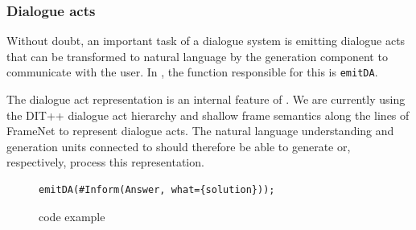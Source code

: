 \subsubsection{Dialogue acts}
\label{sec:caret}


Without doubt, an important task of a dialogue system is emitting dialogue acts that can be transformed to natural language by the generation component to communicate with the user. In \vonda, the function responsible for this is \texttt{emitDA}.

The dialogue act representation is an internal feature of \vonda. We are currently using the DIT++ dialogue act hierarchy \citep{bunt2012iso} and shallow frame semantics along the lines of FrameNet \citep{ruppenhofer2016framenet} to represent dialogue acts. The natural language understanding and generation units connected to \vonda should therefore be able to generate or, respectively, process this representation.

\begin{figure}[htb]
  \centering\small%
\begin{lstlisting}
emitDA(#Inform(Answer, what={solution}));
\end{lstlisting}\vspace*{-3ex}
  \caption{\vonda code example}
  \label{fig:DA}
\end{figure}


